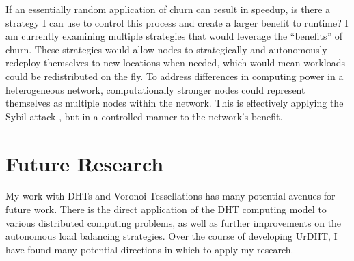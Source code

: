 \documentclass[letterpaper]{article}
\begin{document}
If an essentially random application of churn can result in speedup, is there a strategy I can use to control this process and create a larger benefit to runtime?
I am currently examining multiple strategies that would leverage the ``benefits'' of churn.
These strategies would allow nodes to strategically and autonomously redeploy themselves to new locations when needed, which would mean workloads could be redistributed on the fly.
To address differences in computing power in a heterogeneous network, computationally stronger nodes could represent themselves as multiple nodes within the network.
This is effectively applying the Sybil attack \cite{sybil}, but in a controlled manner to the network's benefit.




%
%
%
%
%


\section{Future Research}

My work with DHTs and Voronoi Tessellations has many potential avenues for future work.
There is the direct application of the DHT computing model to various distributed computing problems, as well as further improvements on the autonomous load balancing strategies.
Over the course of developing UrDHT, I have found many potential directions in which to apply my research.
\end{document}
